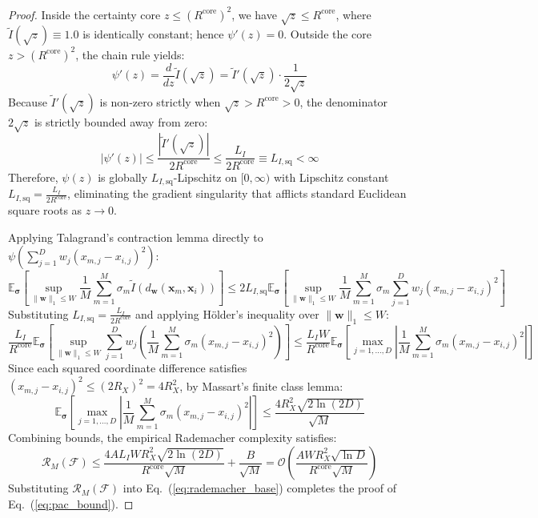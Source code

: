 \documentclass[times, review, 10pt]{elsarticle}
\begin{document}
\begin{proof}
Inside the certainty core $z \le (R^{\mathrm{core}})^2$, we have $\sqrt{z} \le R^{\mathrm{core}}$, where $\tilde{I}(\sqrt{z}) \equiv 1.0$ is identically constant; hence $\psi'(z) = 0$. Outside the core $z > (R^{\mathrm{core}})^2$, the chain rule yields:
\begin{equation}
\psi'(z) = \frac{d}{dz}\tilde{I}(\sqrt{z}) = \tilde{I}'(\sqrt{z}) \cdot \frac{1}{2\sqrt{z}}
\end{equation}
Because $\tilde{I}'(\sqrt{z})$ is non-zero strictly when $\sqrt{z} > R^{\mathrm{core}} > 0$, the denominator $2\sqrt{z}$ is strictly bounded away from zero:
\begin{equation}
|\psi'(z)| \le \frac{|\tilde{I}'(\sqrt{z})|}{2 R^{\mathrm{core}}} \le \frac{L_I}{2 R^{\mathrm{core}}} \equiv L_{I,\mathrm{sq}} < \infty
\end{equation}
Therefore, $\psi(z)$ is globally $L_{I,\mathrm{sq}}$-Lipschitz on $[0, \infty)$ with Lipschitz constant $L_{I,\mathrm{sq}} = \frac{L_I}{2 R^{\mathrm{core}}}$, eliminating the gradient singularity that afflicts standard Euclidean square roots as $z \to 0$.

Applying Talagrand's contraction lemma directly to $\psi\left(\sum_{j=1}^D w_j (x_{m,j} - x_{i,j})^2\right)$:
\begin{equation}
\mathbb{E}_{\boldsymbol{\sigma}}\left[ \sup_{\|\mathbf{w}\|_1 \le W} \frac{1}{M}\sum_{m=1}^M \sigma_m \tilde{I}(d_{\mathbf{w}}(\mathbf{x}_m, \mathbf{x}_i)) \right] \le 2 L_{I,\mathrm{sq}} \mathbb{E}_{\boldsymbol{\sigma}}\left[ \sup_{\|\mathbf{w}\|_1 \le W} \frac{1}{M}\sum_{m=1}^M \sigma_m \sum_{j=1}^D w_j (x_{m,j} - x_{i,j})^2 \right]
\end{equation}
Substituting $L_{I,\mathrm{sq}} = \frac{L_I}{2 R^{\mathrm{core}}}$ and applying H\"older's inequality over $\|\mathbf{w}\|_1 \le W$:
\begin{equation}
\frac{L_I}{R^{\mathrm{core}}} \mathbb{E}_{\boldsymbol{\sigma}}\left[ \sup_{\|\mathbf{w}\|_1 \le W} \sum_{j=1}^D w_j \left( \frac{1}{M}\sum_{m=1}^M \sigma_m (x_{m,j} - x_{i,j})^2 \right) \right] \le \frac{L_I W}{R^{\mathrm{core}}} \mathbb{E}_{\boldsymbol{\sigma}}\left[ \max_{j=1,\dots,D} \left| \frac{1}{M}\sum_{m=1}^M \sigma_m (x_{m,j} - x_{i,j})^2 \right| \right]
\end{equation}
Since each squared coordinate difference satisfies $(x_{m,j} - x_{i,j})^2 \le (2 R_X)^2 = 4 R_X^2$, by Massart's finite class lemma:
\begin{equation}
\mathbb{E}_{\boldsymbol{\sigma}}\left[ \max_{j=1,\dots,D} \left| \frac{1}{M}\sum_{m=1}^M \sigma_m (x_{m,j} - x_{i,j})^2 \right| \right] \le \frac{4 R_X^2 \sqrt{2 \ln(2D)}}{\sqrt{M}}
\end{equation}
Combining bounds, the empirical Rademacher complexity satisfies:
\begin{equation}
\mathcal{R}_M(\mathcal{F}) \le \frac{4 A L_I W R_X^2 \sqrt{2 \ln(2D)}}{R^{\mathrm{core}} \sqrt{M}} + \frac{B}{\sqrt{M}} = \mathcal{O}\left( \frac{A W R_X^2 \sqrt{\ln D}}{R^{\mathrm{core}}\sqrt{M}} \right)
\end{equation}
Substituting $\mathcal{R}_M(\mathcal{F})$ into Eq.~(\ref{eq:rademacher_base}) completes the proof of Eq.~(\ref{eq:pac_bound}).
\end{proof}
\end{document}
